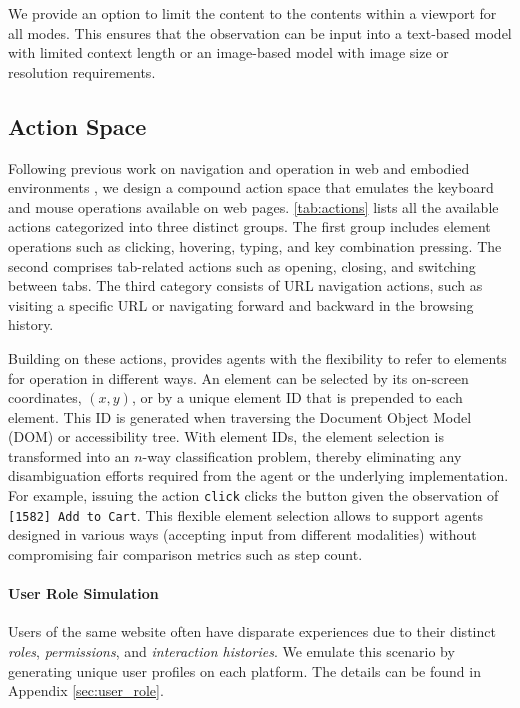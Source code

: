 \documentclass{article}
\begin{document}
We provide an option to limit the content to the contents within a viewport for all modes. %
This ensures that the observation can be input into a text-based model with limited context length or an image-based model with image size or resolution requirements.

\subsection{Action Space}\label{sec:actions}
Following previous work on navigation and operation in web and embodied environments \citep{shi2017world,liu2018reinforcement}, we design a compound action space that emulates the keyboard and mouse operations available on web pages.
\autoref{tab:actions} lists all the available actions categorized into three distinct groups. The first group includes element operations such as clicking, hovering, typing, and key combination pressing. The second comprises tab-related actions such as opening, closing, and switching between tabs. The third category consists of URL navigation actions, such as visiting a specific URL or navigating forward and backward in the browsing history.

Building on these actions, \ours provides agents with the flexibility to refer to elements for operation in different ways.
An element can be selected by its on-screen coordinates, %
$(x, y)$, or by a unique element ID that is prepended to each element. 
This ID is %
generated when traversing the Document Object Model (DOM) or accessibility tree. 
With element IDs, the element selection is transformed into an $n$-way classification problem, thereby eliminating any disambiguation efforts required from the agent or the underlying implementation. 
For example, issuing the action \texttt{click\!\! [1582]} clicks the button given the observation of \texttt{[1582] Add to Cart}.
This flexible element selection allows \ours to support agents designed in various ways (\eg accepting input from different modalities) without compromising fair comparison metrics such as step count.

\paragraph{User Role Simulation}
Users of the same website often have disparate experiences due to their distinct \emph{roles}, \emph{permissions}, and \emph{interaction histories}. 
We emulate this scenario by generating unique user profiles on each platform. The details can be found in Appendix \ref{sec:user_role}.
\end{document}
